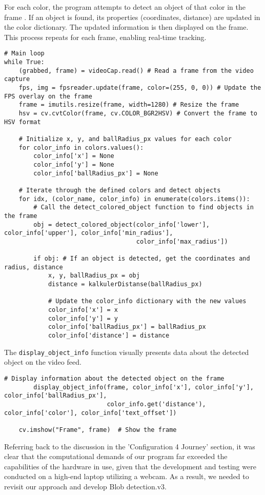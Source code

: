 For each color, the program attempts to detect an object of that color in the frame \cite{OpenCVIterate}. If an object is found, its properties (coordinates, distance) are updated in the color dictionary. The updated information is then displayed \cite{OpenCVDisplay} on the frame. This process repeats for each frame, enabling real-time tracking.
\begin{lstlisting}[language=PythonPlus]
# Main loop
while True:
    (grabbed, frame) = videoCap.read() # Read a frame from the video capture
    fps, img = fpsreader.update(frame, color=(255, 0, 0)) # Update the FPS overlay on the frame
    frame = imutils.resize(frame, width=1280) # Resize the frame
    hsv = cv.cvtColor(frame, cv.COLOR_BGR2HSV) # Convert the frame to HSV format

    # Initialize x, y, and ballRadius_px values for each color
    for color_info in colors.values():
        color_info['x'] = None
        color_info['y'] = None
        color_info['ballRadius_px'] = None

    # Iterate through the defined colors and detect objects
    for idx, (color_name, color_info) in enumerate(colors.items()):
        # Call the detect_colored_object function to find objects in the frame
        obj = detect_colored_object(color_info['lower'], color_info['upper'], color_info['min_radius'],
                                    color_info['max_radius'])

        if obj: # If an object is detected, get the coordinates and radius, distance
            x, y, ballRadius_px = obj
            distance = kalkulerDistanse(ballRadius_px) 
            
            # Update the color_info dictionary with the new values
            color_info['x'] = x
            color_info['y'] = y
            color_info['ballRadius_px'] = ballRadius_px
            color_info['distance'] = distance
\end{lstlisting}

The \verb|display_object_info| function visually \cite{OpenCVDisplay} presents data about the detected object on the video feed.
\begin{lstlisting}[language=PythonPlus]
# Display information about the detected object on the frame
        display_object_info(frame, color_info['x'], color_info['y'], color_info['ballRadius_px'],
                            color_info.get('distance'), color_info['color'], color_info['text_offset'])

    cv.imshow("Frame", frame)  # Show the frame
\end{lstlisting}
Referring back to the discussion in the 'Configuration 4 Journey' section, it was clear that the computational demands of our program far exceeded the capabilities of the hardware in use, given that the development and testing were conducted on a high-end laptop utilizing a webcam. As a result, we needed to revisit our approach and develop Blob detection.v3. 

